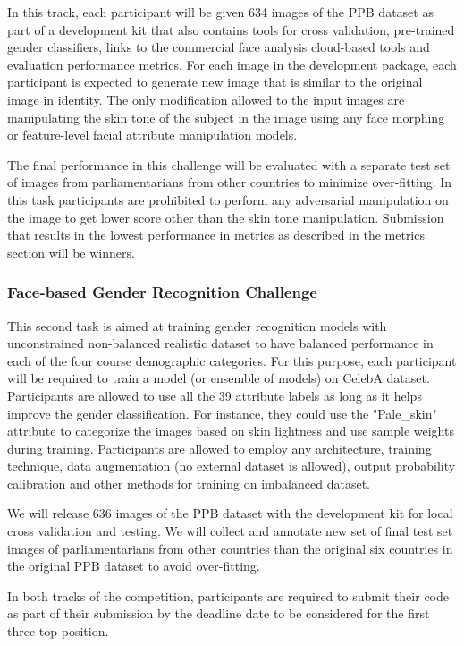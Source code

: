 \documentclass[11pt, oneside]{article}
\begin{document}
In this track, each participant will be given 634 images of the PPB dataset as part of a development kit that also contains tools for cross validation, pre-trained gender classifiers, links to the commercial face analysis cloud-based tools and evaluation performance metrics. For each image in the development package, each participant is expected to generate new image that is similar to the original image in identity. The only modification allowed to the input images are manipulating the skin tone of the subject in the image using any face morphing or feature-level facial attribute manipulation models. 

The final performance in this challenge will be evaluated with a separate test set of images from parliamentarians from other countries to minimize over-fitting. In this task participants are prohibited to perform any adversarial manipulation on the image to get lower score other than the skin tone manipulation. Submission that results in the lowest performance in metrics as described in the metrics section will be winners.
 
\subsubsection{Face-based Gender Recognition Challenge}
This second task is aimed at training gender recognition models with unconstrained non-balanced realistic dataset to have balanced performance in each of the four course demographic categories. For this purpose, each participant will be required to train a model (or ensemble of models) on CelebA dataset. Participants are allowed to use all the 39 attribute labels as long as it helps improve the gender classification. For instance, they could use the "Pale\_skin" attribute to categorize the images based on skin lightness and use sample weights during training. Participants are allowed to employ any architecture, training technique, data augmentation (no external dataset is allowed), output probability calibration and other methods for training on imbalanced dataset.

We will release 636 images of the PPB dataset with the development kit for local cross validation and testing. We will collect and annotate new set of final test set images of parliamentarians from other countries than the original six countries in the original PPB dataset to avoid over-fitting. 

In both tracks of the competition, participants are required to submit their code as part of their submission by the deadline date to be considered for the first three top position.
\end{document}
